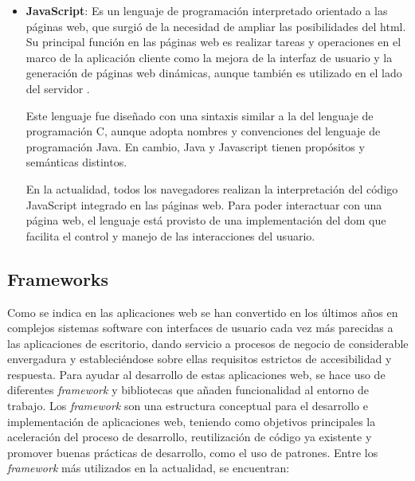 \begin{itemize}
\item \textbf{JavaScript}: Es un lenguaje de programación interpretado orientado a las páginas web, que surgió de la necesidad de ampliar las posibilidades del \acrshort{html}. Su principal función en las páginas web es realizar tareas y operaciones en el marco de la aplicación cliente como la mejora de la interfaz de usuario y la generación de páginas web dinámicas, aunque también es utilizado en el lado del servidor .

Este lenguaje fue diseñado con una sintaxis similar a la del lenguaje de programación C, aunque adopta nombres y convenciones del lenguaje de programación Java. En cambio, Java y Javascript tienen propósitos y semánticas distintos.

En la actualidad, todos los navegadores realizan la interpretación del código JavaScript integrado en las páginas web. Para poder interactuar con una página web, el lenguaje está provisto de una implementación del \acrfull{dom} que facilita el control y manejo de las interacciones del usuario.

\end{itemize}

\subsection{Frameworks}
\label{sec:frameworks}

Como se indica en \cite{garrido2004arquitectura} las aplicaciones web se han convertido en los últimos años en complejos sistemas \gls{software} con interfaces de usuario cada vez más parecidas a las aplicaciones de escritorio, dando servicio a procesos de negocio de considerable envergadura y estableciéndose sobre ellas requisitos estrictos de accesibilidad y respuesta. Para ayudar al desarrollo de estas aplicaciones web, se hace uso de diferentes \emph{\gls{framework}} y bibliotecas que añaden funcionalidad al entorno de trabajo. Los \emph{\gls{framework}} son una estructura conceptual para el desarrollo e implementación de aplicaciones web, teniendo como objetivos principales la aceleración del proceso de desarrollo, reutilización de código ya existente y promover buenas prácticas de desarrollo, como el uso de patrones. Entre los \emph{\gls{framework}} más utilizados en la actualidad, se encuentran:

